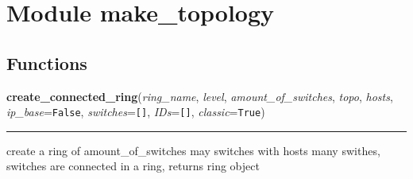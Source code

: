 %
%
%


\section{Module make\_topology}

    \label{make_topology}


  \subsection{Functions}

    \label{make_topology:create_connected_ring}

    \vspace{0.5ex}

\hspace{.8\funcindent}\begin{boxedminipage}{\funcwidth}

    \raggedright \textbf{create\_connected\_ring}(\textit{ring\_name}, \textit{level}, \textit{amount\_of\_switches}, \textit{topo}, \textit{hosts}, \textit{ip\_base}={\tt False}, \textit{switches}={\tt \texttt{[}\texttt{]}}, \textit{IDs}={\tt \texttt{[}\texttt{]}}, \textit{classic}={\tt True})

    \vspace{-1.5ex}

    \rule{\textwidth}{0.5\fboxrule}
\setlength{\parskip}{2ex}
    create a ring of amount\_of\_switches may switches with hosts many 
    swithes, switches are connected in a ring, returns ring object

\setlength{\parskip}{1ex}
    \end{boxedminipage}

    \label{make_topology:quick_test}

